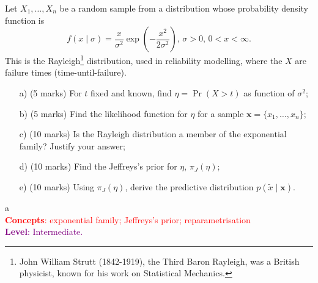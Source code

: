 \documentclass[a4paper,10pt, notitlepage]{report}
\newcommand{\pr}{\operatorname{Pr}} %
\begin{document}
Let $X_1, \ldots, X_n$ be a random sample from a distribution whose probability density function is
\begin{equation*}
 f(x \mid \sigma) = \frac{x}{\sigma^2} \exp\left(-\frac{x^2}{2\sigma^2}\right),\, \sigma>0,\, 0 < x < \infty.
\end{equation*}
This is the Rayleigh\footnote{John William Strutt (1842-1919), the Third Baron Rayleigh, was a British physicist, known for his work on Statistical Mechanics.} distribution, used in reliability modelling, where the $X$ are failure times (time-until-failure).
\begin{itemize}
 \item[a)] (5 marks) For $t$ fixed and known, find $\eta = \pr(X > t)$ as function of $\sigma^2$;
 \item[b)] (5 marks) Find the likelihood function for $\eta$ for a sample $\boldsymbol{x} = \{x_1, \ldots, x_n\}$;
 \item[c)] (10 marks) Is the Rayleigh distribution a member of the exponential family? Justify your answer;
 \item[d)] (10 marks) Find the Jeffreys's prior for $\eta$, $\pi_J(\eta)$;
 \item[e)] (10 marks) Using $\pi_J(\eta)$, derive the predictive distribution $p(\tilde{x} \mid \boldsymbol{x})$.
\end{itemize}
a\\
\textcolor{red}{\textbf{Concepts}: exponential family; Jeffreys's prior; reparametrisation}\\
\textcolor{purple}{\textbf{Level}: Intermediate.}\\
\end{document}
